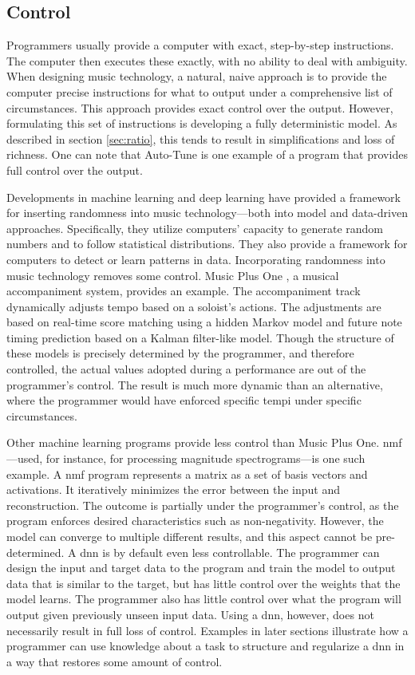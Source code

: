 \subsection{Control}
Programmers usually provide a computer with exact, step-by-step instructions. The computer then executes these exactly, with no ability to deal with ambiguity. When designing music technology, a natural, naive approach is to provide the computer precise instructions for what to output under a comprehensive list of circumstances. This approach provides exact control over the output. However, formulating this set of instructions is developing a fully deterministic model. As described in section \ref{sec:ratio}, this tends to result in simplifications and loss of richness. One can note that Auto-Tune is one example of a program that provides full control over the output.

Developments in machine learning and deep learning have provided a framework for inserting randomness into music technology---both into model and data-driven approaches. Specifically, they utilize computers' capacity to generate random numbers and to follow statistical distributions. They also provide a framework for computers to detect or learn patterns in data. Incorporating randomness into music technology removes some control. Music Plus One \cite{raphael2010music}, a musical accompaniment system, provides an example. The accompaniment track dynamically adjusts tempo based on a soloist's actions. The adjustments are based on real-time score matching using a hidden Markov model and future note timing prediction based on a Kalman filter-like model. Though the structure of these models is precisely determined by the programmer, and therefore controlled, the actual values adopted during a performance are out of the programmer's control. The result is much more dynamic than an alternative, where the programmer would have enforced specific tempi under specific circumstances. 

Other machine learning programs provide less control than Music Plus One. \gls{nmf} \cite{LeeDD2000nips}---used, for instance, for processing magnitude spectrograms---is one such example. A \gls{nmf} program represents a matrix as a set of basis vectors and activations. It iteratively minimizes the error between the input and reconstruction. The outcome is partially under the programmer's control, as the program enforces desired characteristics such as non-negativity. However, the model can converge to multiple different results, and this aspect cannot be pre-determined. A \gls{dnn} is by default even less controllable. The programmer can design the input and target data to the program and train the model to output data that is similar to the target, but has little control over the weights that the model learns. The programmer also has little control over what the program will output given previously unseen input data. Using a \gls{dnn}, however, does not necessarily result in full loss of control. Examples in later sections illustrate how a programmer can use knowledge about a task to structure and regularize a \gls{dnn} in a way that restores some amount of control. 


